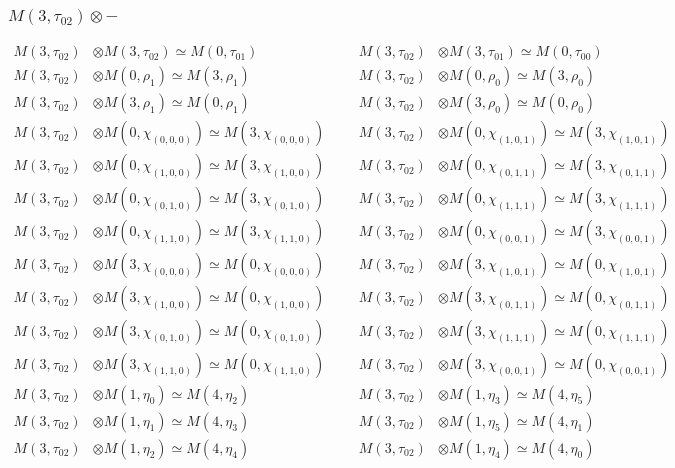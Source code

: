 \subsubsection{$ M(3,\tau_{02})\otimes -$}
\begin{align*}
M(3,\tau_{02}) &\otimes M(3,\tau_{02}) \simeq M(0,\tau_{01}) &&& M(3,\tau_{02}) &\otimes M(3,\tau_{01}) \simeq M(0,\tau_{00})\\
M(3,\tau_{02}) &\otimes M(0,\rho_{1}) \simeq M(3,\rho_{1}) &&& M(3,\tau_{02}) &\otimes M(0,\rho_{0}) \simeq M(3,\rho_{0})\\
M(3,\tau_{02}) &\otimes M(3,\rho_{1}) \simeq M(0,\rho_{1}) &&& M(3,\tau_{02}) &\otimes M(3,\rho_{0}) \simeq M(0,\rho_{0})\\
M(3,\tau_{02}) &\otimes M(0,\chi_{(0,0,0)}) \simeq M(3,\chi_{(0,0,0)}) &&& M(3,\tau_{02}) &\otimes M(0,\chi_{(1,0,1)}) \simeq M(3,\chi_{(1,0,1)})\\
M(3,\tau_{02}) &\otimes M(0,\chi_{(1,0,0)}) \simeq M(3,\chi_{(1,0,0)}) &&& M(3,\tau_{02}) &\otimes M(0,\chi_{(0,1,1)}) \simeq M(3,\chi_{(0,1,1)})\\
M(3,\tau_{02}) &\otimes M(0,\chi_{(0,1,0)}) \simeq M(3,\chi_{(0,1,0)}) &&& M(3,\tau_{02}) &\otimes M(0,\chi_{(1,1,1)}) \simeq M(3,\chi_{(1,1,1)})\\
M(3,\tau_{02}) &\otimes M(0,\chi_{(1,1,0)}) \simeq M(3,\chi_{(1,1,0)}) &&& M(3,\tau_{02}) &\otimes M(0,\chi_{(0,0,1)}) \simeq M(3,\chi_{(0,0,1)})\\
M(3,\tau_{02}) &\otimes M(3,\chi_{(0,0,0)}) \simeq M(0,\chi_{(0,0,0)}) &&& M(3,\tau_{02}) &\otimes M(3,\chi_{(1,0,1)}) \simeq M(0,\chi_{(1,0,1)})\\
M(3,\tau_{02}) &\otimes M(3,\chi_{(1,0,0)}) \simeq M(0,\chi_{(1,0,0)}) &&& M(3,\tau_{02}) &\otimes M(3,\chi_{(0,1,1)}) \simeq M(0,\chi_{(0,1,1)})\\
M(3,\tau_{02}) &\otimes M(3,\chi_{(0,1,0)}) \simeq M(0,\chi_{(0,1,0)}) &&& M(3,\tau_{02}) &\otimes M(3,\chi_{(1,1,1)}) \simeq M(0,\chi_{(1,1,1)})\\
M(3,\tau_{02}) &\otimes M(3,\chi_{(1,1,0)}) \simeq M(0,\chi_{(1,1,0)}) &&& M(3,\tau_{02}) &\otimes M(3,\chi_{(0,0,1)}) \simeq M(0,\chi_{(0,0,1)})\\
M(3,\tau_{02}) &\otimes M(1,\eta_{0}) \simeq M(4,\eta_{2}) &&& M(3,\tau_{02}) &\otimes M(1,\eta_{3}) \simeq M(4,\eta_{5})\\
M(3,\tau_{02}) &\otimes M(1,\eta_{1}) \simeq M(4,\eta_{3}) &&& M(3,\tau_{02}) &\otimes M(1,\eta_{5}) \simeq M(4,\eta_{1})\\
M(3,\tau_{02}) &\otimes M(1,\eta_{2}) \simeq M(4,\eta_{4}) &&& M(3,\tau_{02}) &\otimes M(1,\eta_{4}) \simeq M(4,\eta_{0})\\

\end{align*}
